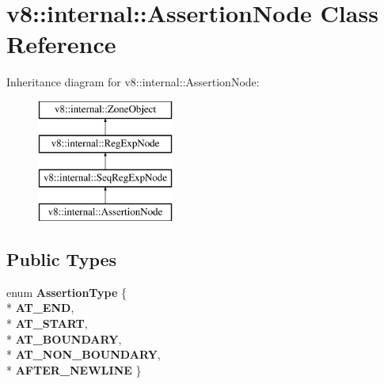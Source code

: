 \hypertarget{classv8_1_1internal_1_1_assertion_node}{}\section{v8\+:\+:internal\+:\+:Assertion\+Node Class Reference}
\label{classv8_1_1internal_1_1_assertion_node}
Inheritance diagram for v8\+:\+:internal\+:\+:Assertion\+Node\+:\begin{figure}[H]
\begin{center}
\leavevmode
\includegraphics[height=4.000000cm]{classv8_1_1internal_1_1_assertion_node}
\end{center}
\end{figure}
\subsection*{Public Types}
\begin{DoxyCompactItemize}
\item 
enum {\bfseries Assertion\+Type} \{ \\*
{\bfseries A\+T\+\_\+\+E\+ND}, 
\\*
{\bfseries A\+T\+\_\+\+S\+T\+A\+RT}, 
\\*
{\bfseries A\+T\+\_\+\+B\+O\+U\+N\+D\+A\+RY}, 
\\*
{\bfseries A\+T\+\_\+\+N\+O\+N\+\_\+\+B\+O\+U\+N\+D\+A\+RY}, 
\\*
{\bfseries A\+F\+T\+E\+R\+\_\+\+N\+E\+W\+L\+I\+NE}
 \}\hypertarget{classv8_1_1internal_1_1_assertion_node_aa677ff26097f7ecb13c9283478981035}{}\label{classv8_1_1internal_1_1_assertion_node_aa677ff26097f7ecb13c9283478981035}

\end{DoxyCompactItemize}
